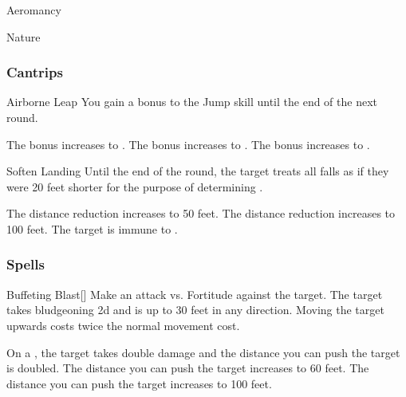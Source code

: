 
\begin{spellsection}{Aeromancy}

\begin{spellheader}
\end{spellheader}


 Nature

\subsubsection{Cantrips}


\begin{freeability}{Airborne Leap}
You gain a  bonus to the Jump skill until the end of the next round.

\rankline
{} The bonus increases to .
 The bonus increases to .
 The bonus increases to .
\end{freeability}


\begin{freeability}{Soften Landing}
Until the end of the round, the target treats all falls as if they were 20 feet shorter for the purpose of determining .

\rankline
{} The distance reduction increases to 50 feet.
 The distance reduction increases to 100 feet.
 The target is immune to .
\end{freeability}

\end{spellsection}


\subsubsection{Spells}


\lowercase{\hypertarget{spell:Buffeting Blast}{}}\label{spell:Buffeting Blast}
\begin{freeability}[Rank 1]{\hypertarget{spell:Buffeting Blast}{Buffeting Blast}}[]
Make an attack vs. Fortitude against the target.
\hit The target takes bludgeoning  \minus2d and is  up to 30 feet in any direction.
Moving the target upwards costs twice the normal movement cost.

\rankline
{} On a , the target takes double damage and the distance you can push the target is doubled.
 The distance you can push the target increases to 60 feet.
 The distance you can push the target increases to 100 feet.
\end{freeability}
\vspace{0.25em}



